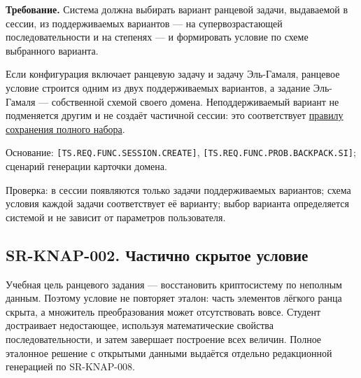 \documentclass[12pt,a4paper]{article}
\begin{document}
\textbf{Требование.} Система должна выбирать вариант ранцевой задачи, выдаваемой в сессии, из поддерживаемых вариантов --- на супервозрастающей последовательности и на степенях --- и формировать условие по схеме выбранного варианта.

Если конфигурация включает ранцевую задачу и задачу Эль-Гамаля, ранцевое условие строится одним из двух поддерживаемых вариантов, а задание Эль-Гамаля --- собственной схемой своего домена. Неподдерживаемый вариант не подменяется другим и не создаёт частичной сессии: это соответствует \href{../07_\%D0\%9F\%D1\%80\%D0\%BE\%D0\%B3\%D1\%80\%D0\%B0\%D0\%BC\%D0\%BC\%D0\%BD\%D1\%8B\%D0\%B5_\%D1\%82\%D1\%80\%D0\%B5\%D0\%B1\%D0\%BE\%D0\%B2\%D0\%B0\%D0\%BD\%D0\%B8\%D1\%8F/DOC-06.2_\%D0\%A1\%D0\%B5\%D1\%81\%D1\%81\%D0\%B8\%D0\%B8_\%D0\%B7\%D0\%B0\%D0\%B4\%D0\%B0\%D1\%87_\%D0\%B8_\%D0\%BF\%D0\%BB\%D0\%B0\%D0\%BD\%D0\%B8\%D1\%80\%D0\%BE\%D0\%B2\%D1\%89\%D0\%B8\%D0\%BA.pdf\#nameddest=swr-ses-005-\%D1\%81\%D0\%BE\%D1\%85\%D1\%80\%D0\%B0\%D0\%BD\%D0\%B5\%D0\%BD\%D0\%B8\%D0\%B5-\%D1\%81\%D0\%BE\%D0\%B7\%D0\%B4\%D0\%B0\%D0\%BD\%D0\%BD\%D0\%BE\%D0\%B3\%D0\%BE-\%D0\%BD\%D0\%B0\%D0\%B1\%D0\%BE\%D1\%80\%D0\%B0}{правилу сохранения полного набора}.

Основание: \texttt{[TS.\allowbreak{}REQ.\allowbreak{}FUNC.\allowbreak{}SESSION.\allowbreak{}CREATE]}, \texttt{[TS.\allowbreak{}REQ.\allowbreak{}FUNC.\allowbreak{}PROB.\allowbreak{}BACKPACK.\allowbreak{}SI]}; сценарий генерации карточки домена.

Проверка: в сессии появляются только задачи поддерживаемых вариантов; схема условия каждой задачи соответствует её варианту; выбор варианта определяется системой и не зависит от параметров пользователя.

\subsection{SR-KNAP-002. Частично скрытое условие}\label{sr-knap-002-ux447ux430ux441ux442ux438ux447ux43dux43e-ux441ux43aux440ux44bux442ux43eux435-ux443ux441ux43bux43eux432ux438ux435}

\hypertarget{sr-knap-002-частично-скрытое-условие}{}

Учебная цель ранцевого задания --- восстановить криптосистему по неполным данным. Поэтому условие не повторяет эталон: часть элементов лёгкого ранца скрыта, а множитель преобразования может отсутствовать вовсе. Студент достраивает недостающее, используя математические свойства последовательности, и затем завершает построение всех величин. Полное эталонное решение с открытыми данными выдаётся отдельно редакционной генерацией по SR-KNAP-008.
\end{document}
